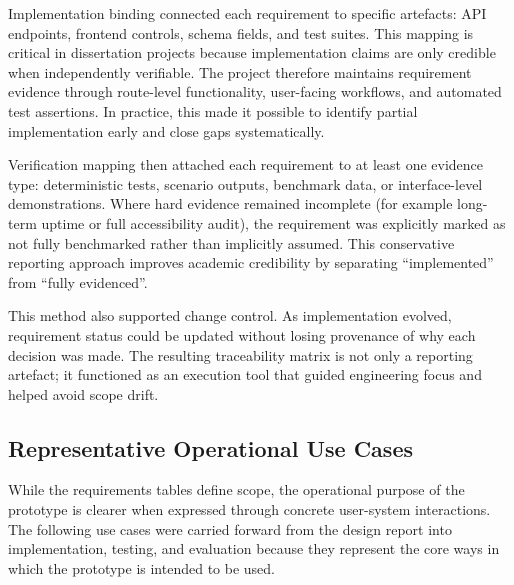 \documentclass[12pt]{article}
\begin{document}
Implementation binding connected each requirement to specific artefacts: API endpoints, frontend controls, schema fields, and test suites. This mapping is critical in dissertation projects because implementation claims are only credible when independently verifiable. The project therefore maintains requirement evidence through route-level functionality, user-facing workflows, and automated test assertions. In practice, this made it possible to identify partial implementation early and close gaps systematically.

Verification mapping then attached each requirement to at least one evidence type: deterministic tests, scenario outputs, benchmark data, or interface-level demonstrations. Where hard evidence remained incomplete (for example long-term uptime or full accessibility audit), the requirement was explicitly marked as not fully benchmarked rather than implicitly assumed. This conservative reporting approach improves academic credibility by separating ``implemented'' from ``fully evidenced''.

This method also supported change control. As implementation evolved, requirement status could be updated without losing provenance of why each decision was made. The resulting traceability matrix is not only a reporting artefact; it functioned as an execution tool that guided engineering focus and helped avoid scope drift.

\subsection{Representative Operational Use Cases}
\label{sec:use_cases}

While the requirements tables define scope, the operational purpose of the prototype is clearer when expressed through concrete user-system interactions. The following use cases were carried forward from the design report into implementation, testing, and evaluation because they represent the core ways in which the prototype is intended to be used.
\end{document}
